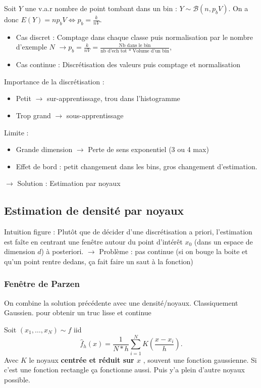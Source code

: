 \documentclass{article}
\begin{document}
\begin{defn}
    Soit $ Y $ une v.a.r nombre de point tombant dans un bin : $ Y \sim \mathcal{B}(n, p_b V)$. On a donc $ E(Y) = n p_b V \Leftrightarrow p_b = \frac{k}{nV} $. 
    \begin{itemize}
        \item Cas discret : Comptage dans chaque classe puis normalisation par le nombre d'exemple $ N $ $\rightarrow p_b = \frac{k}{nV} = \frac{\text{Nb dans le bin}}{\text{nb d'ech tot }*\text{ Volume d'un bin}}$,
        \item Cas continue : Discrétisation des valeurs puis comptage et normalisation
    \end{itemize}
\end{defn}
Importance de la discrétisation : \begin{itemize}
    \item Petit $\rightarrow$ sur-apprentissage, trou dans l'histogramme
    \item Trop grand $\rightarrow$ sous-apprentissage
\end{itemize}
Limite : \begin{itemize}
    \item Grande dimension $\rightarrow$ Perte de sens exponentiel (3 ou 4 max)
    \item Effet de bord : petit changement dans les bins, gros changement d'estimation. 
\end{itemize}
$\rightarrow$ Solution : Estimation par noyaux

\subsection{Estimation de densité par noyaux}

Intuition figure \cite*{intuitionnoyaux} : Plutôt que de décider d'une discrétisation a priori, l'estimation est faîte en centrant une fenêtre autour du point d'intérêt $ x_0 $ (dans un espace de dimension $d$) à posteriori. $\rightarrow$ Problème : pas continue (si on bouge la boite et qu'un point rentre dedans, ça fait faire un saut à la fonction)

\subsubsection{Fenêtre de Parzen}
On combine la solution précédente avec une densité/noyaux. Classiquement Gaussien. pour obtenir un truc lisse et continue
\begin{defn}
    Soit $ (x_1, \dots, x_N) \sim f $ iid 
    \[
        \hat{f}_h(x) = \frac{1}{N*h} \sum_{i=1}^{N}K (\frac{x - x_i}{h})
    .\]
    Avec $ K $ le noyaux \textbf{centrée et réduit sur $ x $ }, souvent une fonction gaussienne. Si c'est une fonction rectangle ça fonctionne aussi. Puis y'a plein d'autre noyaux possible.
\end{defn}
\end{document}
